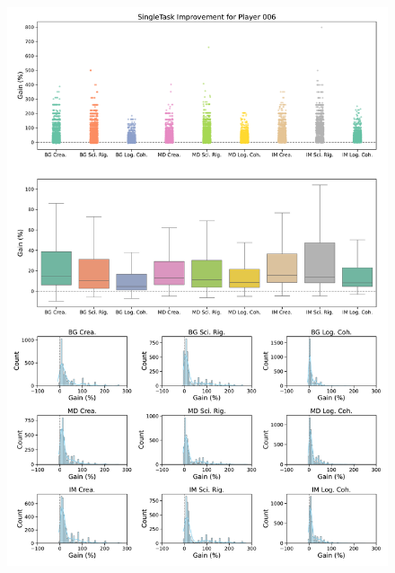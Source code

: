 \begin{figure}[ht]
  \centering
  \includegraphics[width=\textwidth]{figures/gain_validity/singletask/singletask_gain_player_00006.pdf}
\end{figure}
\clearpage

